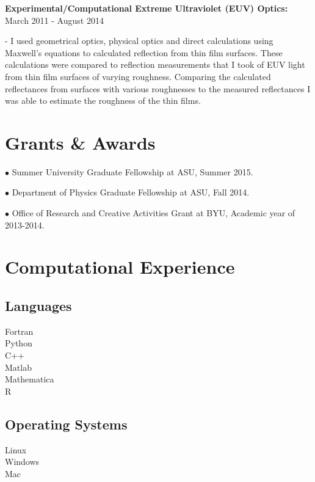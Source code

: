 \documentclass[letterpaper,10pt]{article}
\renewenvironment{itemize}{
  \begin{list}{}{
    \setlength{\leftmargin}{1.5em}
  }
}{
  \end{list}
}
\begin{document}
\begin{itemize}
  \item \textbf{Experimental/Computational Extreme Ultraviolet (EUV) Optics:} March 2011 - August 2014
   \begin{itemize}
      \item - I used geometrical optics, physical optics and direct calculations using Maxwell's equations to calculated reflection from thin film surfaces. These calculations were compared to reflection measurements that I took of EUV light from thin film surfaces of varying roughness. Comparing the calculated reflectances from surfaces with various roughnesses to the measured reflectances I was able to estimate the roughness of the thin films.
  \end{itemize}
\end{itemize}

\section*{Grants \& Awards}
\begin{itemize}
  \item $\bullet$ Summer University Graduate Fellowship at ASU, Summer 2015.
  \item $\bullet$ Department of Physics Graduate Fellowship at ASU, Fall 2014.
  \item $\bullet$ Office of Research and Creative Activities Grant at BYU, Academic year of 2013-2014.
\end{itemize}

\section*{Computational Experience}
 \subsection*{Languages}
\begin{itemize}
  \item Fortran \\ Python \\ C++ \\ Matlab \\ Mathematica \\ R
\end{itemize}
\subsection*{Operating Systems}
\begin{itemize}
  \item Linux \\ Windows \\ Mac
\end{itemize}
\end{document}
